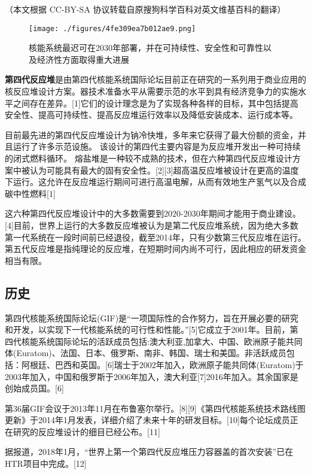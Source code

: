 
（本文根据 CC-BY-SA 协议转载自原搜狗科学百科对英文维基百科的翻译）

\begin{figure}[ht]
\centering
\texttt{[image: ./figures/4fe309ea7b012ae9.png]}
\caption{核能系统最迟可在2030年部署，并在可持续性、安全性和可靠性以 及经济性方面取得重大进展} \label{fig_FYD_9}
\end{figure}

\textbf{第四代反应堆}是由第四代核能系统国际论坛目前正在研究的一系列用于商业应用的核反应堆设计方案。器技术准备水平从需要示范的水平到具有经济竞争力的实施水平之间存在差异。[1]它们的设计理念是为了实现各种各样的目标，其中包括提高安全性、提高可持续性、提高反应堆运行效率以及降低安装成本、运行成本等。

目前最先进的第四代反应堆设计为钠冷快堆，多年来它获得了最大份额的资金，并且运行了许多示范设施。 该设计的第四代主要内容是为反应堆开发出一种可持续的闭式燃料循环。 熔盐堆是一种较不成熟的技术，但在六种第四代反应堆设计方案中被认为可能具有最大的固有安全性。[2][3]超高温反应堆被设计在更高的温度下运行。这允许在反应堆运行期间可进行高温电解，从而有效地生产氢气以及合成碳中性燃料[1]

这六种第四代反应堆设计中的大多数需要到2020-2030年期间才能用于商业建设。[4]目前，世界上运行的大多数反应堆被认为是第二代反应堆系统，因为绝大多数第一代系统在一段时间前已经退役，截至2014年，只有少数第三代反应堆在运行。第五代反应堆是指纯理论的反应堆，在短期时间内尚不可行，因此相应的研发资金相当有限。

\subsection{历史}
第四代核能系统国际论坛(GIF)是“一项国际性的合作努力，旨在开展必要的研究和开发，以实现下一代核能系统的可行性和性能。”[5]它成立于2001年。目前，第四代核能系统国际论坛的活跃成员包括:澳大利亚,加拿大、中国、欧洲原子能共同体(Euratom)、法国、日本、俄罗斯、南非、韩国、瑞士和美国。非活跃成员包括：阿根廷、巴西和英国。[6]瑞士于2002年加入，欧洲原子能共同体(Euratom)于2003年加入，中国和俄罗斯于2006年加入，澳大利亚[7]2016年加入。其余国家是创始成员国。[6]

第36届GIF会议于2013年11月在布鲁塞尔举行。[8][9]《第四代核能系统技术路线图更新》于2014年1月发表，详细介绍了未来十年的研发目标。[10]每个论坛成员正在研究的反应堆设计的细目已经公布。[11]

据报道，2018年1月，“世界上第一个第四代反应堆压力容器盖的首次安装”已在HTR项目中完成。[12]

